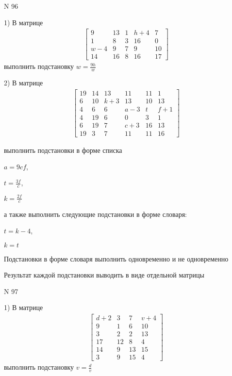 \documentclass[11pt]{report}
\begin{document}
\newpage
N 96


    1) В матрице
\begin{align*}
\left[\begin{matrix}9 & 13 & 1 & h + 4 & 7\\1 & 8 & 3 & 16 & 0\\w - 4 & 9 & 7 & 9 & 10\\14 & 16 & 8 & 16 & 17\end{matrix}\right]
\end{align*}
выполнить подстановку $w=\frac{9 h}{w}$


    2) В матрице
\begin{align*}
\left[\begin{matrix}19 & 14 & 13 & 11 & 11 & 1\\6 & 10 & k + 3 & 13 & 10 & 13\\4 & 6 & 6 & a - 3 & t & f + 1\\4 & 19 & 6 & 0 & 3 & 1\\6 & 19 & 7 & c + 3 & 16 & 13\\19 & 3 & 7 & 11 & 11 & 16\end{matrix}\right]
\end{align*}

выполнить подстановки в форме списка

$a=9 c f$,

$t=\frac{3 f}{c}$,

$k=\frac{2 f}{c}$

а также выполнить следующие подстановки в форме словаря:

$t=k - 4$,

$k=t$


    Подстановки в форме словаря выполнить одновременно и не одновременно


    Результат каждой подстановки выводить в виде отдельной матрицы

\newpage
N 97


    1) В матрице
\begin{align*}
\left[\begin{matrix}d + 2 & 3 & 7 & v + 4\\9 & 1 & 6 & 10\\3 & 2 & 2 & 13\\17 & 12 & 8 & 4\\14 & 9 & 13 & 15\\3 & 9 & 15 & 4\end{matrix}\right]
\end{align*}
выполнить подстановку $v=\frac{d}{v}$
\end{document}
